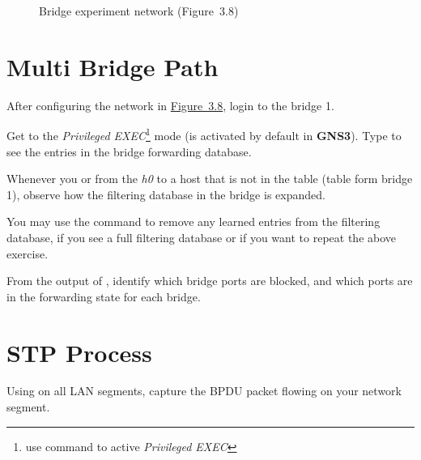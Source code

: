 \documentclass{../UTNetLab}
\begin{document}
\begin{figure}[H]
        \caption{Bridge experiment network (Figure~3.8)}\label{fig:3.8}
    \end{figure}

\section{Multi Bridge Path}
    After configuring the network in \hyperref[fig:3.8]{Figure~3.8}, login to the bridge 1.

    Get to the \textit{Privileged EXEC}\footnote{use  command to active \textit{Privileged EXEC}} mode (is activated by default in \textbf{GNS3}).
    Type  to see the entries in the bridge forwarding database.

    Whenever you  or  from the \textit{h0} to a host that is not in the table (table form bridge 1), observe how the filtering database in the bridge is expanded.

    You may use the  command to remove any learned entries from the filtering database, if you see a full filtering database or if you want to repeat the above exercise.

    \begin{report}
        \item From the output of , identify which bridge ports are blocked, and which ports are in the forwarding state for each bridge.
    \end{report}

\section{STP Process}
    Using  on all LAN segments, capture the BPDU packet flowing on your network segment.
\end{document}
